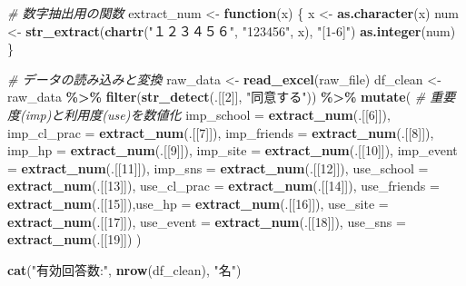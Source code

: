\documentclass[
]{article}
\newenvironment{Shaded}{\begin{snugshade}}{\end{snugshade}}
\newcommand{\AttributeTok}[1]{\textcolor[rgb]{0.13,0.29,0.53}{#1}}
\newcommand{\CommentTok}[1]{\textcolor[rgb]{0.56,0.35,0.01}{\textit{#1}}}
\newcommand{\ControlFlowTok}[1]{\textcolor[rgb]{0.13,0.29,0.53}{\textbf{#1}}}
\newcommand{\DecValTok}[1]{\textcolor[rgb]{0.00,0.00,0.81}{#1}}
\newcommand{\FunctionTok}[1]{\textcolor[rgb]{0.13,0.29,0.53}{\textbf{#1}}}
\newcommand{\NormalTok}[1]{#1}
\newcommand{\OtherTok}[1]{\textcolor[rgb]{0.56,0.35,0.01}{#1}}
\newcommand{\SpecialCharTok}[1]{\textcolor[rgb]{0.81,0.36,0.00}{\textbf{#1}}}
\newcommand{\StringTok}[1]{\textcolor[rgb]{0.31,0.60,0.02}{#1}}
\begin{document}
\begin{Shaded}
\begin{Highlighting}[]
\CommentTok{\# 数字抽出用の関数}
\NormalTok{extract\_num }\OtherTok{\textless{}{-}} \ControlFlowTok{function}\NormalTok{(x) \{}
\NormalTok{  x }\OtherTok{\textless{}{-}} \FunctionTok{as.character}\NormalTok{(x)}
\NormalTok{  num }\OtherTok{\textless{}{-}} \FunctionTok{str\_extract}\NormalTok{(}\FunctionTok{chartr}\NormalTok{(}\StringTok{"１２３４５６"}\NormalTok{, }\StringTok{"123456"}\NormalTok{, x), }\StringTok{"[1{-}6]"}\NormalTok{)}
  \FunctionTok{as.integer}\NormalTok{(num)}
\NormalTok{\}}

\CommentTok{\# データの読み込みと変換}
\NormalTok{raw\_data }\OtherTok{\textless{}{-}} \FunctionTok{read\_excel}\NormalTok{(raw\_file)}
\NormalTok{df\_clean }\OtherTok{\textless{}{-}}\NormalTok{ raw\_data }\SpecialCharTok{\%\textgreater{}\%}
  \FunctionTok{filter}\NormalTok{(}\FunctionTok{str\_detect}\NormalTok{(.[[}\DecValTok{2}\NormalTok{]], }\StringTok{"同意する"}\NormalTok{)) }\SpecialCharTok{\%\textgreater{}\%}
  \FunctionTok{mutate}\NormalTok{(}
    \CommentTok{\# 重要度(imp)と利用度(use)を数値化}
    \AttributeTok{imp\_school =} \FunctionTok{extract\_num}\NormalTok{(.[[}\DecValTok{6}\NormalTok{]]),  }\AttributeTok{imp\_cl\_prac =} \FunctionTok{extract\_num}\NormalTok{(.[[}\DecValTok{7}\NormalTok{]]),}
    \AttributeTok{imp\_friends =} \FunctionTok{extract\_num}\NormalTok{(.[[}\DecValTok{8}\NormalTok{]]), }\AttributeTok{imp\_hp =} \FunctionTok{extract\_num}\NormalTok{(.[[}\DecValTok{9}\NormalTok{]]),}
    \AttributeTok{imp\_site =} \FunctionTok{extract\_num}\NormalTok{(.[[}\DecValTok{10}\NormalTok{]]),   }\AttributeTok{imp\_event =} \FunctionTok{extract\_num}\NormalTok{(.[[}\DecValTok{11}\NormalTok{]]),}
    \AttributeTok{imp\_sns =} \FunctionTok{extract\_num}\NormalTok{(.[[}\DecValTok{12}\NormalTok{]]),}
    \AttributeTok{use\_school =} \FunctionTok{extract\_num}\NormalTok{(.[[}\DecValTok{13}\NormalTok{]]), }\AttributeTok{use\_cl\_prac =} \FunctionTok{extract\_num}\NormalTok{(.[[}\DecValTok{14}\NormalTok{]]),}
    \AttributeTok{use\_friends =} \FunctionTok{extract\_num}\NormalTok{(.[[}\DecValTok{15}\NormalTok{]]),}\AttributeTok{use\_hp =} \FunctionTok{extract\_num}\NormalTok{(.[[}\DecValTok{16}\NormalTok{]]),}
    \AttributeTok{use\_site =} \FunctionTok{extract\_num}\NormalTok{(.[[}\DecValTok{17}\NormalTok{]]),   }\AttributeTok{use\_event =} \FunctionTok{extract\_num}\NormalTok{(.[[}\DecValTok{18}\NormalTok{]]),}
    \AttributeTok{use\_sns =} \FunctionTok{extract\_num}\NormalTok{(.[[}\DecValTok{19}\NormalTok{]])}
\NormalTok{  )}

\FunctionTok{cat}\NormalTok{(}\StringTok{"有効回答数:"}\NormalTok{, }\FunctionTok{nrow}\NormalTok{(df\_clean), }\StringTok{"名"}\NormalTok{)}
\end{Highlighting}
\end{Shaded}
\end{document}
